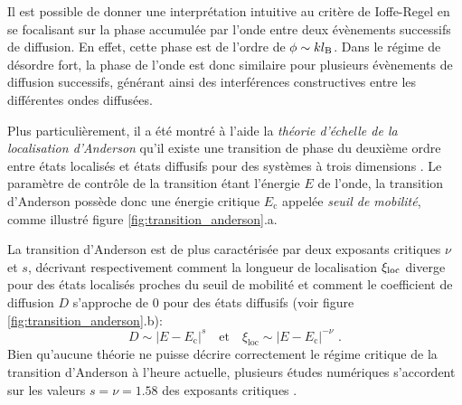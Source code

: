 Il est possible de donner une interprétation intuitive au critère de Ioffe-Regel en se focalisant sur la phase accumulée par l'onde entre deux évènements successifs de diffusion. En effet, cette phase est de l'ordre de $\phi\sim kl_{\mathrm{B}}$. Dans le régime de désordre fort, la phase de l'onde est donc similaire pour plusieurs évènements de diffusion successifs, générant ainsi des interférences constructives entre les différentes ondes diffusées. 

Plus particulièrement, il a été montré à l'aide la \emph{théorie d'échelle de la localisation d'Anderson} qu'il existe une transition de phase du deuxième ordre entre états localisés et états diffusifs pour des systèmes à trois dimensions \citep{abrahams1979scaling}. Le paramètre de contrôle de la transition étant l'énergie $E$ de l'onde, la transition d'Anderson possède donc une énergie critique $E_{\mathrm{c}}$ appelée \emph{seuil de mobilité}, comme illustré figure \ref{fig:transition_anderson}.a. 

La transition d'Anderson est de plus caractérisée par deux exposants critiques $\nu$ et $s$, décrivant respectivement comment la longueur de localisation $\xi_{\mathrm{loc}}$ diverge pour des états localisés proches du seuil de mobilité et comment le coefficient de diffusion $D$ s'approche de $0$ pour des états diffusifs (voir figure \ref{fig:transition_anderson}.b):
\begin{equation}
D \sim \left| E-E_{\mathrm{c}} \right|^s \quad \text{et} \quad \xi_{\mathrm{loc}} \sim \left| E-E_{\mathrm{c}} \right|^{-\nu} \text{ .}
\end{equation}
Bien qu'aucune théorie ne puisse décrire correctement le régime critique de la transition d'Anderson à l'heure actuelle, plusieurs études numériques s'accordent sur les valeurs $s=\nu=1.58$ des exposants critiques \citep{slevin1999corrections} \citep{evers2008anderson} \citep{slevin2014critical}.


